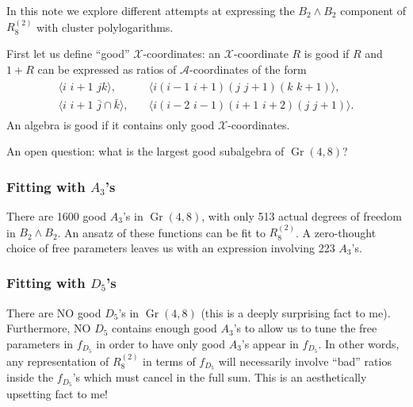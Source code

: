 \documentclass[12pt]{article}
\DeclareMathOperator{\Gr}{Gr}
\def\ket#1{\langle #1 \rangle}
\begin{document}
\thispagestyle{fancyplain}
 
\fancyhf{}
 
\cfoot{\fancyplain{}{\thepage}}


In this note we explore different attempts at expressing the $B_2\wedge B_2$ component of $R^{(2)}_8$ with cluster polylogarithms.

First let us define ``good'' $\mathcal{X}$-coordinates: an $\mathcal{X}$-coordinate $R$ is good if $R$ and $1+R$ can be expressed as ratios of $\mathcal{A}$-coordinates of the form
\begin{align}\label{def:letters}
\begin{split}
\ket{i\,\,i{+}1\,\,jk},& \quad 
\ket{i(i{-}1\,\,i{+}1)(j\,\,j{+}1)(k\,\,k{+}1)}, \\ 
\ket{i\,\,i{+}1\,\,\bar{j}\cap\bar{k}},& \quad
\ket{i(i{-}2\,\,i{-}1)(i{+}1\,\,i{+}2)(j\,\,j{+}1)}.
\end{split}
\end{align}
An algebra is good if it contains only good $\mathcal{X}$-coordinates. 

An open question: what is the largest good subalgebra of $\Gr(4,8)$?

\subsubsection*{Fitting with $A_3$'s}

There are 1600 good $A_3$'s in $\Gr(4,8)$, with only 513 actual degrees of freedom in $B_2\wedge B_2$. An ansatz of these functions can be fit to $R^{(2)}_8$. A zero-thought choice of free parameters leaves us with an expression involving 223 $A_3$'s.

\subsubsection*{Fitting with $D_5$'s}

There are NO good $D_5$'s in $\Gr(4,8)$ (this is a deeply surprising fact to me). Furthermore, NO $D_5$ contains enough good $A_3$'s to allow us to tune the free parameters in $f_{D_5}$ in order to have only good $A_3$'s appear in $f_{D_5}$. In other words, any representation of $R^{(2)}_8$ in terms of $f_{D_5}$ will necessarily involve ``bad'' ratios inside the $f_{D_5}$'s which must cancel in the full sum. This is an aesthetically upsetting fact to me!
\end{document}
